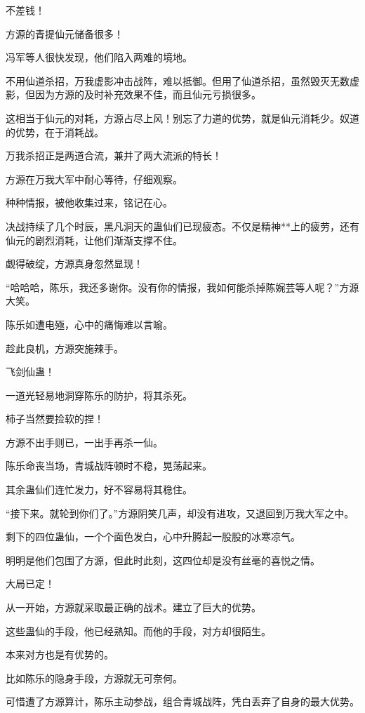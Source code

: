\begin{this_body}
不差钱！

方源的青提仙元储备很多！

冯军等人很快发现，他们陷入两难的境地。

不用仙道杀招，万我虚影冲击战阵，难以抵御。但用了仙道杀招，虽然毁灭无数虚影，但因为方源的及时补充效果不佳，而且仙元亏损很多。

这相当于仙元的对耗，方源占尽上风！别忘了力道的优势，就是仙元消耗少。奴道的优势，在于消耗战。

万我杀招正是两道合流，兼并了两大流派的特长！

方源在万我大军中耐心等待，仔细观察。

种种情报，被他收集过来，铭记在心。

决战持续了几个时辰，黑凡洞天的蛊仙们已现疲态。不仅是精神**上的疲劳，还有仙元的剧烈消耗，让他们渐渐支撑不住。

觑得破绽，方源真身忽然显现！

“哈哈哈，陈乐，我还多谢你。没有你的情报，我如何能杀掉陈婉芸等人呢？”方源大笑。

陈乐如遭电殛，心中的痛悔难以言喻。

趁此良机，方源突施辣手。

飞剑仙蛊！

一道光轻易地洞穿陈乐的防护，将其杀死。

柿子当然要捡软的捏！

方源不出手则已，一出手再杀一仙。

陈乐命丧当场，青城战阵顿时不稳，晃荡起来。

其余蛊仙们连忙发力，好不容易将其稳住。

“接下来。就轮到你们了。”方源阴笑几声，却没有进攻，又退回到万我大军之中。

剩下的四位蛊仙，一个个面色发白，心中升腾起一股股的冰寒凉气。

明明是他们包围了方源，但此时此刻，这四位却是没有丝毫的喜悦之情。

大局已定！

从一开始，方源就采取最正确的战术。建立了巨大的优势。

这些蛊仙的手段，他已经熟知。而他的手段，对方却很陌生。

本来对方也是有优势的。

比如陈乐的隐身手段，方源就无可奈何。

可惜遭了方源算计，陈乐主动参战，组合青城战阵，凭白丢弃了自身的最大优势。


\end{this_body}
